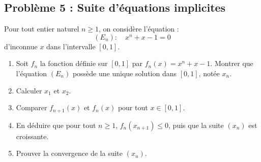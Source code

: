 \subsection*{Problème 5 : Suite d'équations implicites}
Pour tout entier naturel $n \ge 1$, on considère l'équation :
\[
(E_n) : \quad x^n + x - 1 = 0
\]
d'inconnue $x$ dans l'intervalle $[0, 1]$.
\begin{enumerate}
    \item Soit $f_n$ la fonction définie sur $[0, 1]$ par $f_n(x) = x^n + x - 1$.
    Montrer que l'équation $(E_n)$ possède une unique solution dans $[0, 1]$, notée $x_n$.
    \item Calculer $x_1$ et $x_2$.
    \item Comparer $f_{n+1}(x)$ et $f_n(x)$ pour tout $x \in [0, 1]$.
    \item En déduire que pour tout $n \ge 1$, $f_n(x_{n+1}) \le 0$, puis que la suite $(x_n)$ est croissante.
    \item Prouver la convergence de la suite $(x_n)$.
\end{enumerate}

